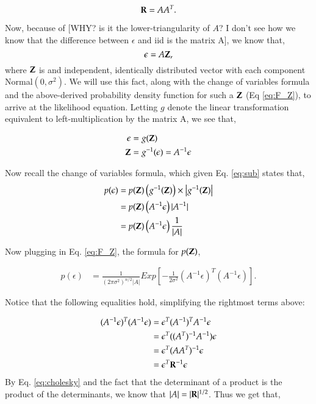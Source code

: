 \begin{equation} \label{eq:cholesky}
\mathbf{R} = A A^T.
\end{equation}

Now, because of [WHY? is it the lower-triangularity of $A$? I don't see how we know that the difference between $\epsilon$ and iid is the matrix A], we know that,
\begin{equation} \label{Y_sub}
\epsilon=A\mathbf{Z},
\end{equation}
where $\mathbf{Z}$ is and independent, identically distributed vector with each component Normal$(0,\sigma^2)$. We will use this fact, along with the change of variables formula and the above-derived probability density function for such a $\mathbf{Z}$ (Eq \ref{eq:F_Z}), to arrive at the likelihood equation. Letting $g$ denote the linear transformation equivalent to left-multiplication by the matrix A, we see that,

\begin{align}
\epsilon &= g(\mathbf{Z}) \nonumber \\
\mathbf{Z} &= g^{-1}(\epsilon) = A^{-1}\epsilon
\label{eq:sub}
\end{align}



Now recall the change of variables formula, which given Eq. \ref{eq:sub} states that,
\begin{align} \label{eq:change_of_vars}
p(\epsilon) &= p(\mathbf{Z})\left (g^{-1}(\mathbf{Z})\right)\times \left | g^{-1}(\mathbf{Z}) \right | \\
			 &= p(\mathbf{Z})\left (A^{-1}\epsilon\right) |A^{-1}| \\ 
			 &= p(\mathbf{Z})\left (A^{-1}\epsilon\right) \frac{1}{|A|}
\end{align}

Now plugging in Eq. \ref{eq:F_Z}, the formula for $p(\mathbf{Z})$, 

\begin{align} \label{eq:getting_F_Y}
p(\epsilon) &= \frac{1}{(2\pi\sigma^2)^{n/2}|A|} {E}xp\left [ -\frac{1}{2\sigma^2}(A^{-1}\epsilon)^T(A^{-1}\epsilon)\right ].
\end{align}

Notice that the following equalities hold, simplifying the rightmost terms above:

\begin{align}
(A^{-1}\epsilon)^T(A^{-1}\epsilon) &= \epsilon^T(A^{-1})^TA^{-1}\epsilon \nonumber\\
			 						 &= \epsilon^T((A^T)^{-1}A^{-1})\epsilon\nonumber\\
									 &= \epsilon^T(AA^T)^{-1}\epsilon\nonumber\\
									 &= \epsilon^T\mathbf{R}^{-1}\epsilon
									 \label{eq:inverse}
\end{align}
By Eq. \ref{eq:cholesky} and the fact that the determinant of a product is the product of the determinants, we know that  $|A|=|\mathbf{R}|^{1/2}$. Thus we get that,

